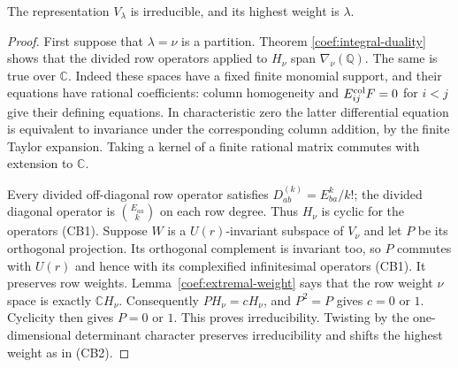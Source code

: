 \begin{lemma}\label{cb-polynomial-irreducible}
The representation $V_\lambda$ is irreducible, and its highest
weight is $\lambda$.
\end{lemma}
\begin{proof}
First suppose that $\lambda=\nu$ is a partition.  Theorem
\ref{coef:integral-duality} shows that the divided row operators
applied to $H_\nu$ span $\nabla_\nu(\mathbb Q)$.  The same is
true over $\mathbb C$.  Indeed these spaces have a fixed finite
monomial support, and their equations have rational coefficients:
column homogeneity and $E^{\rm col}_{ij}F=0$ for $i<j$ give their
defining equations.  In characteristic zero the latter differential
equation is equivalent to invariance under the corresponding column
addition, by the finite Taylor expansion.  Taking a kernel of a
finite rational matrix commutes with extension to $\mathbb C$.

Every divided off-diagonal row operator satisfies
$D_{ab}^{(k)}=E_{ba}^k/k!$;
the divided diagonal operator is $\binom{E_{aa}}k$ on each row
degree.  Thus $H_\nu$ is cyclic for the operators (CB1).
Suppose $W$ is a $U(r)$-invariant subspace of $V_\nu$ and let
$P$ be its orthogonal projection.  Its orthogonal complement is
invariant too, so $P$ commutes with $U(r)$ and hence with its
complexified infinitesimal operators (CB1).  It preserves row
weights.  Lemma~\ref{coef:extremal-weight} says that the row
weight $\nu$ space is exactly $\mathbb C H_\nu$.
Consequently $PH_\nu=cH_\nu$, and $P^2=P$ gives $c=0$ or $1$.
Cyclicity then gives $P=0$ or $1$.  This proves irreducibility.
Twisting by the one-dimensional determinant character preserves
irreducibility and shifts the highest weight as in (CB2).
\end{proof}

